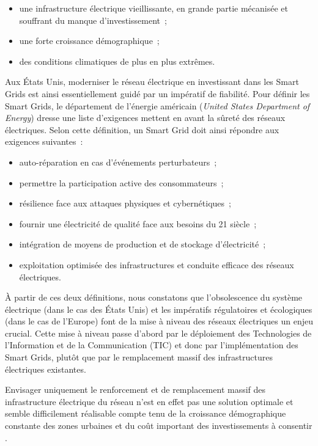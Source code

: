 \begin{itemize}
    \item une infrastructure électrique vieillissante, en grande partie
    mécanisée et souffrant du manque d'investissement~;
    \item une forte croissance démographique~;
    \item des conditions climatiques de plus en plus extrêmes.
\end{itemize}

Aux États Unis, moderniser le réseau électrique en investissant dans les Smart 
Grids est ainsi essentiellement guidé par un impératif de fiabilité. Pour 
définir les Smart Grids, le département de l'énergie américain (\textit{United 
States Department of Energy}) dresse une liste d'exigences mettent en avant la 
sûreté des réseaux électriques\cite{USDE}. Selon cette définition, un Smart Grid 
doit ainsi répondre aux exigences suivantes~:

\begin{itemize}
\item auto-réparation en cas d'événements perturbateurs~;
\item permettre la participation active des consommateurs~; 
\item résilience face aux attaques physiques et cybernétiques~;
\item fournir une électricité de qualité face aux besoins du 21 siècle~;
\item intégration de moyens de production et de stockage d'électricité~;
\item exploitation optimisée des infrastructures et conduite efficace des 
réseaux électriques.
\end{itemize} 

À partir de ces deux définitions, nous constatons que l'obsolescence du système 
électrique (dans le cas des États Unis) et les impératifs régulatoires et 
écologiques (dans le cas de l'Europe) font de la mise à niveau des réseaux 
électriques un enjeu crucial. Cette mise à niveau passe d'abord par le 
déploiement des Technologies de l'Information et de la Communication (TIC) et 
donc par l'implémentation des Smart Grids, plutôt que par le remplacement massif 
des infrastructures électriques existantes.

Envisager uniquement le renforcement et de remplacement massif des 
infrastructure électrique du  réseau 
n'est en effet pas une solution optimale et semble difficilement réalisable 
compte tenu de la croissance démographique constante des zones urbaines et du 
coût important des investissements à consentir \cite{cre}.

